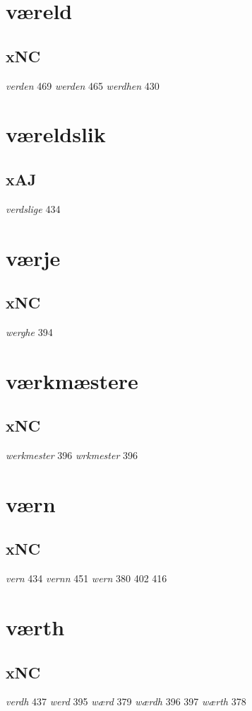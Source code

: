 \documentclass[a4paper,twocolumn]{article}
\begin{document}
\section{væreld}
\label{sec:org104ca66}
\subsection{xNC}
\label{sec:orgbe3965e}
\emph{verden} 469 \emph{werden} 465 \emph{werdhen} 430 
\section{væreldslik}
\label{sec:org9eea74a}
\subsection{xAJ}
\label{sec:org78633dc}
\emph{verdslige} 434 
\section{værje}
\label{sec:orgcd56f8f}
\subsection{xNC}
\label{sec:org44e28fe}
\emph{werghe} 394 
\section{værkmæstere}
\label{sec:org52dd9c1}
\subsection{xNC}
\label{sec:orgeb3f8bf}
\emph{werkmester} 396 \emph{wrkmester} 396 
\section{værn}
\label{sec:org68e205c}
\subsection{xNC}
\label{sec:org841aeef}
\emph{vern} 434 \emph{vernn} 451 \emph{wern} 380 402 416 
\section{værth}
\label{sec:orge40f61c}
\subsection{xNC}
\label{sec:orgc36fbac}
\emph{verdh} 437 \emph{werd} 395 \emph{wærd} 379 \emph{wærdh} 396 397 \emph{wærth} 378 
\end{document}
